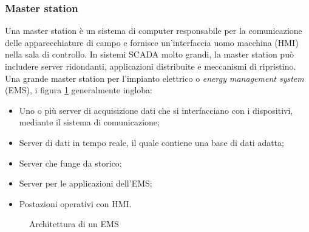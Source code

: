 \subsubsection{Master station}
Una master station è un sistema di computer responsabile per la comunicazione delle apparecchiature di campo e fornisce un'interfaccia uomo macchina (HMI) nella sala di controllo. In sistemi SCADA molto grandi, la master station può includere server ridondanti, applicazioni distribuite e meccanismi di ripristino. Una grande master station per l'impianto elettrico o \emph{energy management system} (EMS), i figura \ref{fig:25} generalmente ingloba:
\begin{itemize}
	\item Uno o più server di acquisizione dati che si interfacciano con i dispositivi, mediante il sistema di comunicazione;
	\item Server di dati in tempo reale, il quale contiene una base di dati adatta;
	\item Server che funge da storico;
	\item Server per le applicazioni dell'EMS;
	\item Postazioni operativi con HMI.
\end{itemize}    

\begin{figure}[h] 
\caption{Architettura di un EMS}\label{fig:25}
\end{figure}

